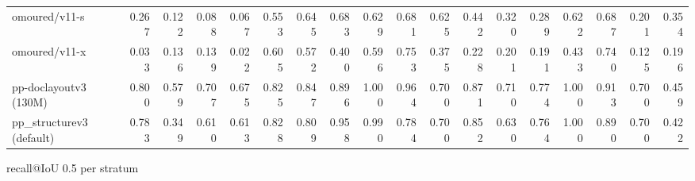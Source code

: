 \documentclass[border=2pt]{standalone}
\begin{document}
\begin{tabular}{lrrrrrrrrrrrrrrrrr}
omoured/v11-s & 0.267 & 0.122 & 0.088 & 0.067 & 0.553 & 0.645 & 0.683 & 0.629 & 0.681 & 0.625 & 0.442 & 0.320 & 0.289 & 0.622 & 0.687 & 0.201 & 0.354 \\
omoured/v11-x & 0.033 & 0.136 & 0.139 & 0.022 & 0.605 & 0.572 & 0.400 & 0.596 & 0.753 & 0.375 & 0.228 & 0.201 & 0.191 & 0.433 & 0.740 & 0.125 & 0.196 \\
pp-doclayoutv3 (130M) & 0.800 & 0.579 & 0.707 & 0.675 & 0.825 & 0.847 & 0.896 & 1.000 & 0.964 & 0.700 & 0.871 & 0.710 & 0.774 & 1.000 & 0.913 & 0.700 & 0.459 \\
pp\_structurev3 (default) & 0.783 & 0.349 & 0.610 & 0.613 & 0.828 & 0.809 & 0.958 & 0.990 & 0.784 & 0.700 & 0.852 & 0.630 & 0.764 & 1.000 & 0.890 & 0.700 & 0.422 \\
\bottomrule
\end{tabular}

\par\smallskip recall@IoU 0.5 per stratum
\end{document}
